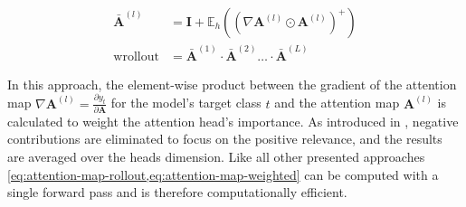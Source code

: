 \begin{equation}
    \begin{aligned}
        \bar{\mathbf{A}}^{(l)}   & =\mathbf{I} + \mathbb{E}_h\left(\left(\nabla \mathbf{A}^{(l)} \odot \mathbf{A}^{(l)}\right)^{+}\right) \\
        \operatorname {wrollout} & =\bar{\mathbf{A}}^{(1)} \cdot \bar{\mathbf{A}}^{(2)} \ldots \cdot \bar{\mathbf{A}}^{(L)}
    \end{aligned}
    \label{eq:attention-map-weighted}
\end{equation}

In this approach, the element-wise product between the gradient of the attention map $\nabla \mathbf{A}^{(l)}=\frac{\partial y_t}{\partial \mathbf{A}}$ for the model's target class $t$ and the attention map $\mathbf{A}^{(l)}$ is calculated to weight the attention head's importance. As introduced in \textcite[\checkmark][786]{cheferTransformerInterpretabilityAttention2021}, negative contributions are eliminated to focus on the positive relevance, and the results are averaged over the heads dimension. Like all other presented approaches \cref{eq:attention-map-rollout,eq:attention-map-weighted} can be computed with a single forward pass and is therefore computationally efficient.
